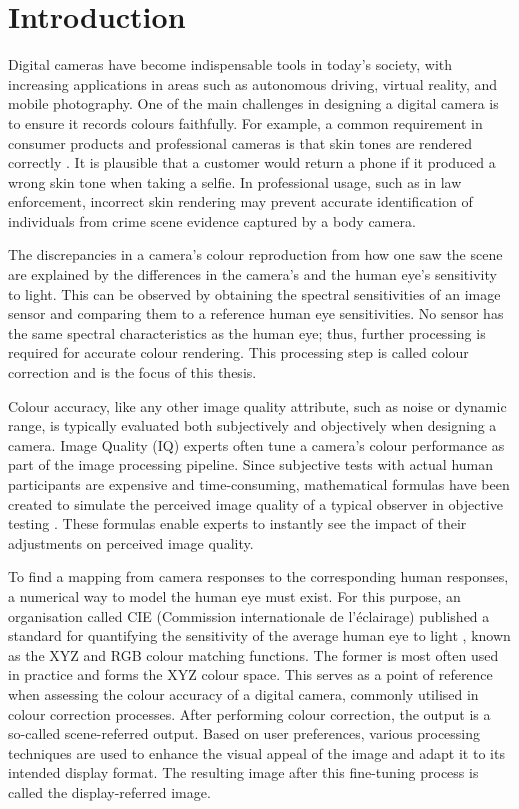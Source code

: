 \chapter{Introduction}%
\label{ch:introduction}

Digital cameras have become indispensable tools in today's society, with increasing applications in areas such as autonomous driving, virtual reality, and mobile photography. One of the main challenges in designing a digital camera is to ensure it records colours faithfully. For example, a common requirement in consumer products and professional cameras is that skin tones are rendered correctly \cite{imatest2024skin}. It is plausible that a customer would return a phone if it produced a wrong skin tone when taking a selfie. In professional usage, such as in law enforcement, incorrect skin rendering may prevent accurate identification of individuals from crime scene evidence captured by a body camera. 

The discrepancies in a camera's colour reproduction from how one saw the scene are explained by the differences in the camera's and the human eye's sensitivity to light. This can be observed by obtaining the spectral sensitivities of an image sensor and comparing them to a reference human eye sensitivities. No sensor has the same spectral characteristics as the human eye; thus, further processing is required for accurate colour rendering. This processing step is called colour correction and is the focus of this thesis.

Colour accuracy, like any other image quality attribute, such as noise or dynamic range, is typically evaluated both subjectively and objectively when designing a camera. Image Quality (IQ) experts often tune a camera's colour performance as part of the image processing pipeline. Since subjective tests with actual human participants are expensive and time-consuming, mathematical formulas have been created to simulate the perceived image quality of a typical observer in objective testing \cite[31-32]{phillips2018camera}. These formulas enable experts to instantly see the impact of their adjustments on perceived image quality.

To find a mapping from camera responses to the corresponding human responses, a numerical way to model the human eye must exist. For this purpose, an organisation called CIE (Commission internationale de l'éclairage) published a standard for quantifying the sensitivity of the average human eye to light \cite{cie1931}, known as the XYZ and RGB colour matching functions. The former is most often used in practice and forms the XYZ colour space. This serves as a point of reference when assessing the colour accuracy of a digital camera, commonly utilised in colour correction processes. After performing colour correction, the output is a so-called scene-referred output. Based on user preferences, various processing techniques are used to enhance the visual appeal of the image and adapt it to its intended display format. The resulting image after this fine-tuning process is called the display-referred image.

